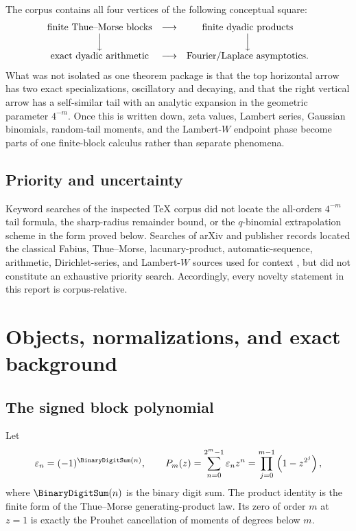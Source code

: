 \documentclass[11pt,oneside]{article}
\numberwithin{equation}{section}
\theoremstyle{definition}
\theoremstyle{remark}
\newcommand{\eps}{\varepsilon}
\begin{document}
The corpus contains all four vertices of the following conceptual square:
\[
\begin{array}{ccc}
\text{finite Thue--Morse blocks} & \longrightarrow & \text{finite dyadic products}\\
\Big\downarrow && \Big\downarrow\\
\text{exact dyadic arithmetic} & \longrightarrow & \text{Fourier/Laplace asymptotics}.
\end{array}
\]
What was not isolated as one theorem package is that the top horizontal arrow has two exact
specializations, oscillatory and decaying, and that the right vertical arrow has a
self-similar tail with an analytic expansion in the geometric parameter $4^{-m}$.  Once this
is written down, zeta values, Lambert series, Gaussian binomials, random-tail moments, and the
Lambert-$W$ endpoint phase become parts of one finite-block calculus rather than separate
phenomena.

\subsection{Priority and uncertainty}

Keyword searches of the inspected TeX corpus did not locate the all-orders $4^{-m}$ tail
formula, the sharp-radius remainder bound, or the $q$-binomial extrapolation scheme in the
form proved below.  Searches of arXiv and publisher records located the classical Fabius,
Thue--Morse, lacunary-product, automatic-sequence, arithmetic, Dirichlet-series, and
Lambert-$W$ sources used for context \cite{p2:arias1982,p2:arias2017arith,p2:aistleitner2015,p2:toth2022,p2:corless1996,p2:allouche2003}, but did not constitute an exhaustive priority search.  Accordingly, every novelty statement in this report is
corpus-relative.

\section{Objects, normalizations, and exact background}
\label{p2:sec:objects}

\subsection{The signed block polynomial}

Let
\begin{equation}
 \eps_n=(-1)^{\BinaryDigitSum(n)},\qquad
 P_m(z)=\sum_{n=0}^{2^m-1}\eps_n z^n
       =\prod_{j=0}^{m-1}\left(1-z^{2^j}\right),
 \label{p2:eq:Pm}
\end{equation}
where $\BinaryDigitSum(n)$ is the binary digit sum.  The product identity is the finite form of the
Thue--Morse generating-product law.  Its zero of order $m$ at $z=1$ is exactly the Prouhet
cancellation of moments of degrees below $m$.
\end{document}
